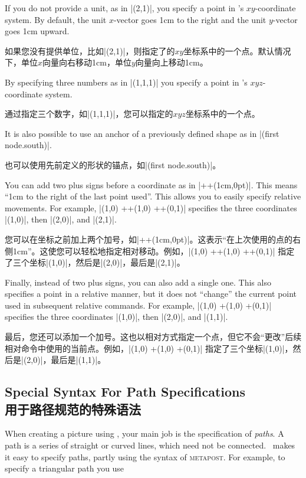 If you do not provide a unit, as in |(2,1)|, you specify a point in \pgfname's
$xy$-coordinate system. By default, the unit $x$-vector goes 1cm to the right
and the unit $y$-vector goes 1cm upward.

如果您没有提供单位，比如|(2,1)|，则指定了\pgfname 的$xy$坐标系中的一个点。默认情况下，单位$x$向量向右移动1cm，单位$y$向量向上移动1cm。

By specifying three numbers as in |(1,1,1)| you specify a point in \pgfname's
$xyz$-coordinate system.

通过指定三个数字，如|(1,1,1)|，您可以指定\pgfname 的$xyz$坐标系中的一个点。

It is also possible to use an anchor of a previously defined shape as in
|(first node.south)|.

也可以使用先前定义的形状的锚点，如|(first node.south)|。

You can add two plus signs before a coordinate as in |++(1cm,0pt)|. This means
``1cm to the right of the last point used''. This allows you to easily specify
relative movements. For example, |(1,0) ++(1,0) ++(0,1)| specifies the three
coordinates |(1,0)|, then |(2,0)|, and |(2,1)|.

您可以在坐标之前加上两个加号，如|++(1cm,0pt)|。这表示``在上次使用的点的右侧1cm''。这使您可以轻松地指定相对移动。例如，|(1,0) ++(1,0) ++(0,1)| 指定了三个坐标|(1,0)|，然后是|(2,0)|，最后是|(2,1)|。

Finally, instead of two plus signs, you can also add a single one. This also
specifies a point in a relative manner, but it does not ``change'' the current
point used in subsequent relative commands. For example, |(1,0) +(1,0) +(0,1)|
specifies the three coordinates |(1,0)|, then |(2,0)|, and |(1,1)|.

最后，您还可以添加一个加号。这也以相对方式指定一个点，但它不会``更改''后续相对命令中使用的当前点。例如，|(1,0) +(1,0) +(0,1)| 指定了三个坐标|(1,0)|，然后是|(2,0)|，最后是|(1,1)|。


\subsection{Special Syntax For Path Specifications\\用于路径规范的特殊语法}

When creating a picture using \tikzname, your main job is the specification of
\emph{paths}. A path is a series of straight or curved lines, which need not be
connected. \tikzname\ makes it easy to specify paths, partly using the syntax
of \textsc{metapost}. For example, to specify a triangular path you use


